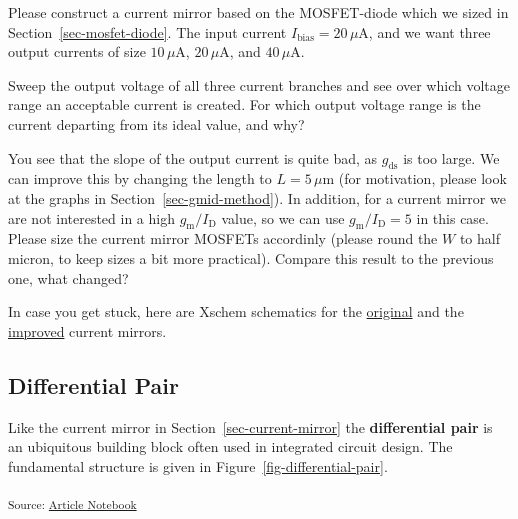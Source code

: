 \documentclass[
  a4paper,
  DIV=11,
  numbers=noendperiod]{scrartcl}
\begin{document}
\begin{tcolorbox}[enhanced jigsaw, arc=.35mm, leftrule=.75mm, toprule=.15mm, bottomrule=.15mm, opacityback=0, toptitle=1mm, colbacktitle=quarto-callout-tip-color!10!white, colframe=quarto-callout-tip-color-frame, left=2mm, titlerule=0mm, bottomtitle=1mm, coltitle=black, title=\textcolor{quarto-callout-tip-color}{\faLightbulb}\hspace{0.5em}{Exercise}, breakable, rightrule=.15mm, colback=white, opacitybacktitle=0.6]

Please construct a current mirror based on the MOSFET-diode which we
sized in Section~\ref{sec-mosfet-diode}. The input current
\(I_\mathrm{bias} = 20\,\mu\text{A}\), and we want three output currents
of size \(10\,\mu\text{A}\), \(20\,\mu\text{A}\), and
\(40\,\mu\text{A}\).

Sweep the output voltage of all three current branches and see over
which voltage range an acceptable current is created. For which output
voltage range is the current departing from its ideal value, and why?

You see that the slope of the output current is quite bad, as
\(g_\mathrm{ds}\) is too large. We can improve this by changing the
length to \(L = 5\,\mu\text{m}\) (for motivation, please look at the
graphs in Section~\ref{sec-gmid-method}). In addition, for a current
mirror we are not interested in a high \(g_\mathrm{m}/I_\mathrm{D}\)
value, so we can use \(g_\mathrm{m}/I_\mathrm{D}= 5\) in this case.
Please size the current mirror MOSFETs accordinly (please round the
\(W\) to half micron, to keep sizes a bit more practical). Compare this
result to the previous one, what changed?

In case you get stuck, here are Xschem schematics for the
\href{./xschem/current_mirror.sch}{original} and the
\href{./xschem/current_mirror_improved.sch}{improved} current mirrors.

\end{tcolorbox}

\subsection{Differential Pair}\label{sec-diff-pair}

Like the current mirror in Section~\ref{sec-current-mirror} the
\textbf{differential pair} is an ubiquitous building block often used in
integrated circuit design. The fundamental structure is given in
Figure~\ref{fig-differential-pair}.

\textsubscript{Source:
\href{https://iic-jku.github.io/analog-circuit-design/index.qmd.html}{Article
Notebook}}
\end{document}
